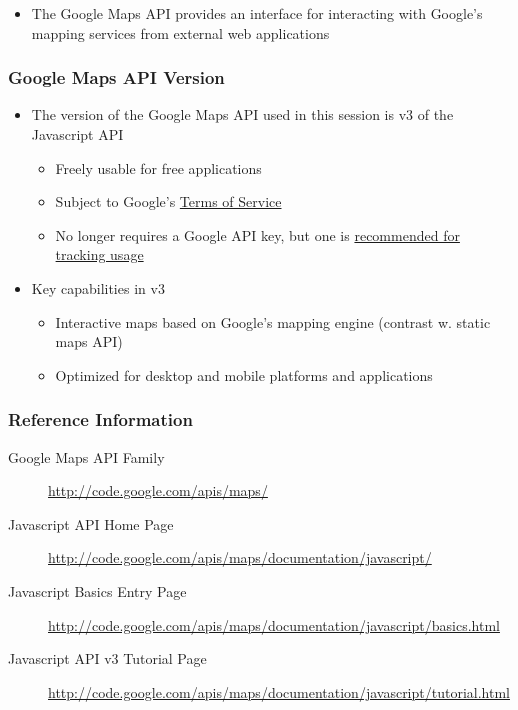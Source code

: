 \documentclass[]{article}
\begin{document}
\begin{itemize}
\itemsep1pt\parskip0pt
\item
  The Google Maps API provides an interface for interacting with
  Google's mapping services from external web applications
\end{itemize}

\subsubsection{Google Maps API Version}\label{google-maps-api-version}

\begin{itemize}
\itemsep1pt\parskip0pt
\item
  The version of the Google Maps API used in this session is v3 of the
  Javascript API

  \begin{itemize}
  \itemsep1pt\parskip0pt
  \item
    Freely usable for free applications
  \item
    Subject to Google's
    \href{https://developers.google.com/maps/terms?hl=en}{Terms of
    Service}
  \item
    No longer requires a Google API key, but one is
    \href{http://tinyurl.com/d52lcm2}{recommended for tracking usage}
  \end{itemize}
\item
  Key capabilities in v3

  \begin{itemize}
  \itemsep1pt\parskip0pt
  \item
    Interactive maps based on Google's mapping engine (contrast w.
    static maps API)
  \item
    Optimized for desktop and mobile platforms and applications
  \end{itemize}
\end{itemize}

\subsubsection{Reference Information}\label{reference-information}

\begin{description}
\item[Google Maps API Family]
\url{http://code.google.com/apis/maps/}
\item[Javascript API Home Page]
\url{http://code.google.com/apis/maps/documentation/javascript/}
\item[Javascript Basics Entry Page]
\url{http://code.google.com/apis/maps/documentation/javascript/basics.html}
\item[Javascript API v3 Tutorial Page]
\url{http://code.google.com/apis/maps/documentation/javascript/tutorial.html}
\end{description}
\end{document}
